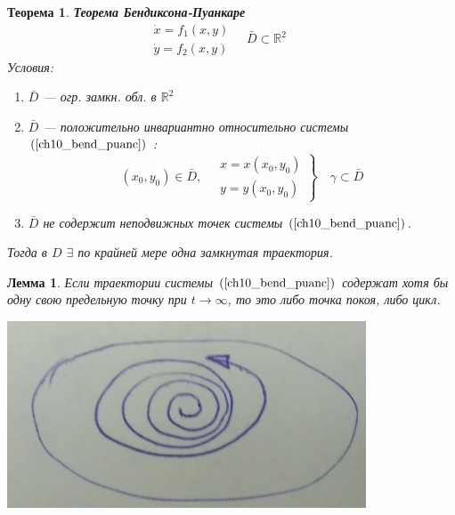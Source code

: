 \documentclass[oneside, final, 12pt]{article}
\theoremstyle{def}
\theoremstyle{th}
\newtheorem{theorem}{Теорема}[section]
\newtheorem{lemma}{Лемма}[section]
\theoremstyle{rem}
\numberwithin{figure}{section}
\numberwithin{equation}{section}
\begin{document}
	\begin{theorem} \textbf{Теорема Бендиксона-Пуанкаре \vspace{5mm}} \newline
			\begin{equation}
				\begin{gathered}
						\dot{x} = f_1(x,y) \\
						\dot{y} =f_2(x,y)
				\end{gathered} \quad \bar{D} \subset \mathbb{R}^2 \ \label{ch10_bend_puanc} \qquad 
			\end{equation}
			Условия:
			\begin{enumerate}
				\item $\bar{D}$ --- огр. замкн. обл. в $\mathbb{R}^2$
				\item $\bar{D}$ --- положительно инвариантно относительно системы $(\ref{ch10_bend_puanc})$ :
					$$
						(x_0, y_0) \in \bar{D}, \quad \left. \begin{gathered}
																				x = x(x_0,y_0) \\
																				y = y(x_0,y_0)
																			\end{gathered} \right\} \quad \gamma \subset \bar{D}
					$$
				\item $\bar{D}$ не содержит неподвижных точек системы $(\ref{ch10_bend_puanc})$.
			\end{enumerate}
			Тогда в $D$ $\exists$ по крайней мере одна замкнутая траектория. 	
	\end{theorem}
	
	\begin{minipage}{0.6\textwidth}
		\begin{lemma}
			Если траектории системы $(\ref{ch10_bend_puanc})$ содержат хотя бы одну свою предельную точку
			при $t\rightarrow\infty$, то это либо точка покоя, либо цикл.
		\end{lemma} 
	\end{minipage}
	\hfill
	\begin{minipage}{0.3\textwidth}
		\begin{center} \includegraphics[width=0.8\textwidth]{pict/pict_8.png} \vspace{5mm}\end{center} 
	\end{minipage}
\end{document}
